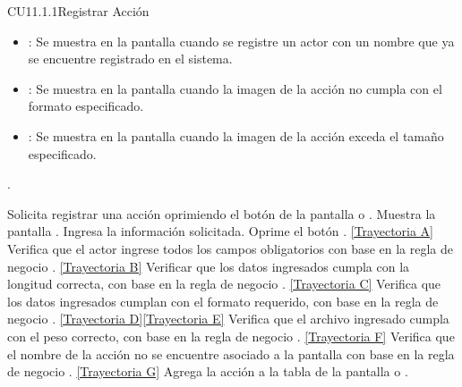 \begin{UseCase}{CU11.1.1}{Registrar Acción}
{\begin{itemize}
			\item {}: Se muestra en la pantalla  cuando se registre un actor con un nombre que ya se encuentre registrado en el sistema.
			\item {}: Se muestra en la pantalla  cuando la imagen de la acción no cumpla con el formato especificado.
			\item {}: Se muestra en la pantalla  cuando la imagen de la acción exceda el tamaño especificado.
		\end{itemize}.
	}
\end{UseCase}
\begin{UCtrayectoria}
	\UCpaso[\UCactor] Solicita registrar una acción oprimiendo el botón  de la pantalla  o .
	\UCpaso[\UCsist] Muestra la pantalla .
	\UCpaso[\UCactor] Ingresa la información solicitada. \label{CU11.1.1-P3}
	\UCpaso[\UCactor] Oprime el botón . \hyperlink{CU11-1-1:TAA}{[Trayectoria A]} 
	\UCpaso[\UCsist] Verifica que el actor ingrese todos los campos obligatorios con base en la regla de negocio . \hyperlink{CU11-1-1:TAB}{[Trayectoria B]}
	\UCpaso[\UCsist] Verificar que los datos ingresados cumpla con la longitud correcta, con base en la regla de negocio . \hyperlink{CU11-1-1:TAC}{[Trayectoria C]}
	\UCpaso[\UCsist] Verifica que los datos ingresados cumplan con el formato requerido, con base en la regla de negocio . \hyperlink{CU11-1-1:TAD}{[Trayectoria D]}\hyperlink{CU11-1-1:TAE}{[Trayectoria E]}
	\UCpaso[\UCsist] Verifica que el archivo ingresado cumpla con el peso correcto, con base en la regla de negocio . \hyperlink{CU11-1-1:TAF}{[Trayectoria F]}
	\UCpaso[\UCsist] Verifica que el nombre de la acción no se encuentre asociado a la pantalla con base en la regla de negocio . \hyperlink{CU11-1-1:TAG}{[Trayectoria G]}
	\UCpaso[\UCsist] Agrega la acción a la tabla de la pantalla  o .
\end{UCtrayectoria}		
